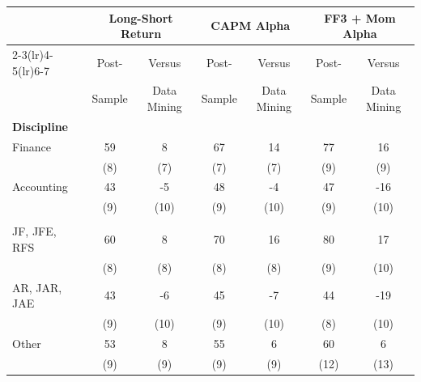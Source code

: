 \begin{tabular}{lcccccc}
   \toprule
   & \multicolumn{2}{c}{Long-Short Return} & \multicolumn{2}{c}{CAPM Alpha} & \multicolumn{2}{c}{FF3 + Mom Alpha} \\
   \cmidrule(lr){2-3}\cmidrule(lr){4-5}\cmidrule(lr){6-7}
   & Post- & \multicolumn{1}{c}{Versus} & Post- & \multicolumn{1}{c}{Versus} & Post- & \multicolumn{1}{c}{Versus} \\
   & Sample & \multicolumn{1}{c}{Data Mining} & Sample & \multicolumn{1}{c}{Data Mining} & Sample & \multicolumn{1}{c}{Data Mining} \\
   \midrule
   \multicolumn{7}{l}{\textbf{Discipline}} \\
   Finance & 59 & 8 & 67 & 14 & 77 & 16 \\
   & (8) & (7) & (7) & (7) & (9) & (9) \\
   Accounting & 43 & -5 & 48 & -4 & 47 & -16 \\
   & (9) & (10) & (9) & (10) & (9) & (10) \\
   \addlinespace
   \multicolumn{7}{l}{\textbf{Journal Rank}} \\
   JF, JFE, RFS & 60 & 8 & 70 & 16 & 80 & 17 \\
   & (8) & (8) & (8) & (8) & (9) & (10) \\
   AR, JAR, JAE & 43 & -6 & 45 & -7 & 44 & -19 \\
   & (9) & (10) & (9) & (10) & (8) & (10) \\
   Other & 53 & 8 & 55 & 6 & 60 & 6 \\
   & (9) & (9) & (9) & (9) & (12) & (13) \\
   \bottomrule
\end{tabular}

